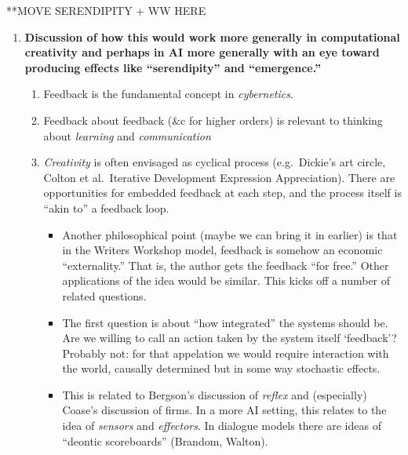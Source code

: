 **MOVE SERENDIPITY + WW HERE

\begin{enumerate}[start=4]
\item \textbf{Discussion of how this would work more generally in
  computational creativity and perhaps in AI more generally with an
  eye toward producing effects like ``serendipity'' and
  ``emergence.''}
\begin{enumerate}
\item Feedback is the fundamental concept in \emph{cybernetics}.  
\item Feedback about feedback (\&c for higher orders) is relevant to thinking about \emph{learning} and \emph{communication}
\item \emph{Creativity} is often envisaged as cyclical process (e.g.~Dickie's
  art circle, Colton et al.~Iterative
  Development Expression Appreciation).  There are opportunities for
  embedded feedback at each step, and the process itself is ``akin
  to'' a feedback loop.
\begin{itemize}
\item Another philosophical point (maybe we can bring it in earlier)
  is that in the Writers Workshop model, feedback is somehow an
  economic ``externality.''  That is, the author gets the feedback
  ``for free.''  Other applications of the idea would be similar.
  This kicks off a number of related questions.
\item The first question is about ``how integrated'' the systems
  should be.  Are we willing to call an action taken by the system
  itself `feedback'?  Probably not: for that appelation we would
  require interaction with the world, causally determined but in some
  way stochastic effects.
\item This is related to Bergson's discussion of \emph{reflex} and
  (especially) Coase's discussion of firms.  In a more AI setting,
  this relates to the idea of \emph{sensors} and \emph{effectors}.  In
  dialogue models there are ideas of ``deontic scoreboards''
  (Brandom, Walton).
\end{itemize}
\end{enumerate}
\end{enumerate}
